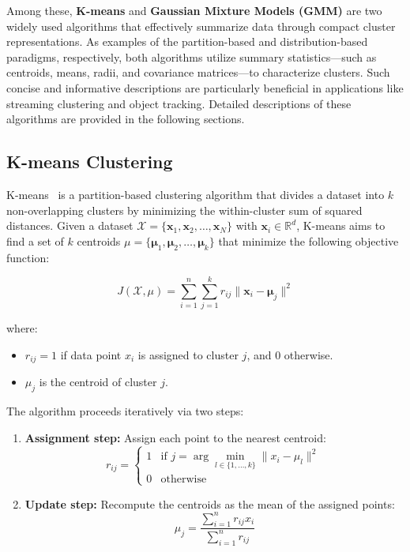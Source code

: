 Among these, \textbf{K-means} and \textbf{Gaussian Mixture Models (GMM)} are
two widely used algorithms that effectively summarize data through compact
cluster representations. As examples of the partition-based and
distribution-based paradigms, respectively, both algorithms utilize summary
statistics—such as centroids, means, radii, and covariance matrices—to
characterize clusters. Such concise and informative descriptions are
particularly beneficial in applications like streaming clustering and object
tracking. Detailed descriptions of these algorithms are provided in the
following sections.

\subsection*{K-means Clustering}
K-means~\cite{k_means} is a partition-based clustering algorithm that divides a
dataset into $k$ non-overlapping clusters by minimizing the within-cluster sum
of squared distances. Given a dataset $\mathcal{X} = \{\mathbf{x}_1,
    \mathbf{x}_2, \ldots, \mathbf{x}_N\}$ with $\mathbf{x}_i \in \mathbb{R}^d$,
K-means aims to find a set of $k$ centroids $\mu = \{\boldsymbol{\mu}_1,
    \boldsymbol{\mu}_2, \ldots, \boldsymbol{\mu}_k\}$ that minimize the following
objective function:

\begin{equation}
    J(\mathcal{X}, \mu) = \sum_{i=1}^{n} \sum_{j=1}^{k} r_{ij} \| \mathbf{x}_i - \boldsymbol{\mu}_j \|^2
\end{equation}

where:
\begin{itemize}
    \item $r_{ij} = 1$ if data point $x_i$ is assigned to cluster $j$, and $0$ otherwise.
    \item $\mu_j$ is the centroid of cluster $j$.
\end{itemize}

The algorithm proceeds iteratively via two steps:
\begin{enumerate}
    \item \textbf{Assignment step:} Assign each point to the nearest centroid:
          \begin{equation}
              r_{ij} =
              \begin{cases}
                  1 & \text{if } j = \arg \min_{l \in \{1, \ldots, k\}} \|x_i - \mu_l\|^2 \\
                  0 & \text{otherwise}
              \end{cases}
          \end{equation}
    \item \textbf{Update step:} Recompute the centroids as the mean of the assigned points:
          \begin{equation}
              \mu_j = \frac{\sum_{i=1}^{n} r_{ij} x_i}{\sum_{i=1}^{n} r_{ij}}
          \end{equation}
\end{enumerate}

